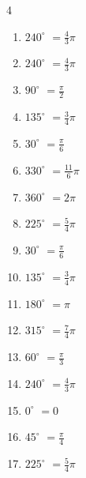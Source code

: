\begin{multicols}{4}
\begin{enumerate}
  \item $\displaystyle 240^{\circ}$
        $\displaystyle =\frac{4}{3}\pi$

  \item $\displaystyle 240^{\circ}$
        $\displaystyle =\frac{4}{3}\pi$

  \item $\displaystyle 90^{\circ}$
        $\displaystyle =\frac{\pi}{2}$

\columnbreak %

  \item $\displaystyle 135^{\circ}$
        $\displaystyle =\frac{3}{4}\pi$

  \item $\displaystyle 30^{\circ}$
        $\displaystyle =\frac{\pi}{6}$

  \item $\displaystyle 330^{\circ}$
        $\displaystyle =\frac{11}{6}\pi$

  \item $\displaystyle 360^{\circ}$
        $\displaystyle =2\pi$

  \item $\displaystyle 225^{\circ}$
        $\displaystyle =\frac{5}{4}\pi$

  \item $\displaystyle 30^{\circ}$
        $\displaystyle =\frac{\pi}{6}$

  \item $\displaystyle 135^{\circ}$
        $\displaystyle =\frac{3}{4}\pi$

  \item $\displaystyle 180^{\circ}$
        $\displaystyle =\pi$

  \item $\displaystyle 315^{\circ}$
        $\displaystyle =\frac{7}{4}\pi$

  \item $\displaystyle 60^{\circ}$
        $\displaystyle =\frac{\pi}{3}$

  \item $\displaystyle 240^{\circ}$
        $\displaystyle =\frac{4}{3}\pi$

  \item $\displaystyle 0^{\circ}$
        $\displaystyle =0$

  \item $\displaystyle 45^{\circ}$
        $\displaystyle =\frac{\pi}{4}$

  \item $\displaystyle 225^{\circ}$
        $\displaystyle =\frac{5}{4}\pi$


\end{enumerate}
\end{multicols}
